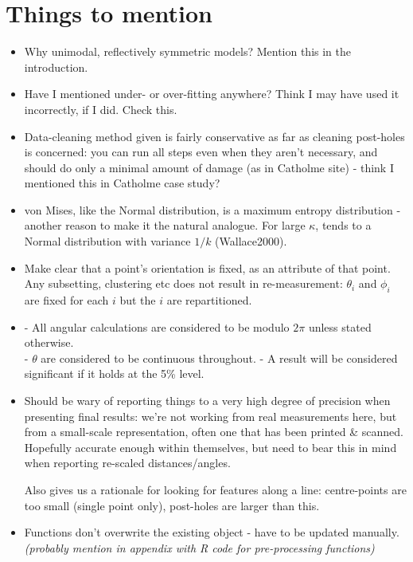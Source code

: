 \documentclass[12pt,fleqn]{article}
\numberwithin{equation}{section}
\numberwithin{figure}{section}
\numberwithin{table}{section}
\begin{document}
\section*{Things to mention}
\begin{itemize}

\item
Why unimodal, reflectively symmetric models? Mention this in the introduction.

\item
Have I mentioned under- or over-fitting anywhere? Think I may have used it incorrectly, if I did. Check this.

\item
Data-cleaning method given is fairly conservative as far as cleaning post-holes is concerned: you can run all steps even when they aren't necessary, and should do only a minimal amount of damage (as in Catholme site) - think I mentioned this in Catholme case study?

\item
von Mises, like the Normal distribution, is a maximum entropy distribution - another reason to make it the natural analogue. For large $\kappa$, tends to a Normal distribution with variance $1/k$ (Wallace2000).

\item
Make clear that a point's orientation is fixed, as an attribute of that point. Any subsetting, clustering etc does not result in re-measurement: $\theta_i$ and $\phi_i$ are fixed for each $i$ but the $i$ are repartitioned.

\item
 - All angular calculations are considered to be modulo $2\pi$ unless stated otherwise.\\
 - $\theta$ are considered to be continuous throughout.
 - A result will be considered significant if it holds at the 5\% level.

\item
Should be wary of reporting things to a very high degree of precision when presenting final results: we're not working from real measurements here, but from a small-scale representation, often one that has been printed \& scanned. Hopefully accurate enough within themselves, but need to bear this in mind when reporting re-scaled distances/angles.

Also gives us a rationale for looking for features along a line: centre-points are too small (single point only), post-holes are larger than this.

\item
Functions don't overwrite the existing object - have to be updated manually.
\textit{(probably mention in appendix with R code for pre-processing functions)
}

\end{itemize}
\newpage
\end{document}

